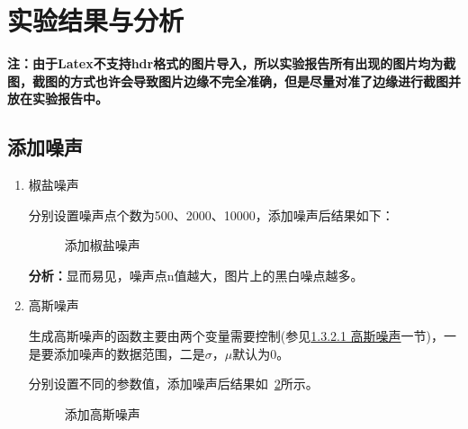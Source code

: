\documentclass[lang=cn,10pt]{elegantbook}
\begin{document}
\section{实验结果与分析}

\textcolor{main}{\textbf{注：由于Latex不支持hdr格式的图片导入，所以实验报告所有出现的图片均为截图，截图的方式也许会导致图片边缘不完全准确，但是尽量对准了边缘进行截图并放在实验报告中。}}

\subsection{添加噪声}

\begin{enumerate}[itemsep=1.5ex]
  \item 椒盐噪声
  
\quad 分别设置噪声点个数为500、2000、10000，添加噪声后结果如下：

\begin{figure}[htbp]
	\centering
	\caption{添加椒盐噪声}
	\label{salt_noise}
\end{figure}

\quad \textcolor{second}{\textbf{分析：}}显而易见，噪声点n值越大，图片上的黑白噪点越多。

\item 高斯噪声

\quad 生成高斯噪声的函数主要由两个变量需要控制(参见\hyperref[sec:g_noise]{1.3.2.1 高斯噪声}一节)，一是要添加噪声的数据范围，二是$\sigma$，$\mu$默认为0。

\quad 分别设置不同的参数值，添加噪声后结果如~\ref{fig:g_noise}所示。
\begin{figure}[htbp]
	\centering
    \label{fig:salt}
    \label{fig:g_0.1}
    \label{fig:g_1}
    \label{fig:g_200}
    \label{fig:50f}
    \label{fig:100f}
	\caption{添加高斯噪声}
	\label{fig:g_noise}
\end{figure}


\end{enumerate}
\end{document}

